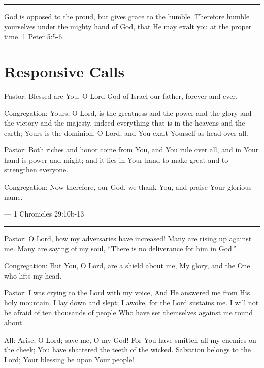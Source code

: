 \documentclass[]{book}
\begin{document}
\begin{center}\rule{0.5\linewidth}{\linethickness}\end{center}

God is opposed to the proud, but gives grace to the humble. Therefore
humble yourselves under the mighty hand of God, that He may exalt you at
the proper time. \textbar{} 1 Peter 5:5-6

\hypertarget{responsive-calls}{\section*{Responsive
Calls}\label{responsive-calls}}

Pastor: Blessed are You, O Lord God of Israel our father, forever and
ever.

Congregation: Yours, O Lord, is the greatness and the power and the
glory and the victory and the majesty, indeed everything that is in the
heavens and the earth; Yours is the dominion, O Lord, and You exalt
Yourself as head over all.

Pastor: Both riches and honor come from You, and You rule over all, and
in Your hand is power and might; and it lies in Your hand to make great
and to strengthen everyone.

Congregation: Now therefore, our God, we thank You, and praise Your
glorious name.

--- \textbar{} 1 Chronicles 29:10b-13 \textbar{}

\begin{center}\rule{0.5\linewidth}{\linethickness}\end{center}

Pastor: O Lord, how my adversaries have increased! Many are rising up
against me. Many are saying of my soul, ``There is no deliverance for
him in God.''

Congregation: But You, O Lord, are a shield about me, My glory, and the
One who lifts my head.

Pastor: I was crying to the Lord with my voice, And He answered me from
His holy mountain. I lay down and slept; I awoke, for the Lord sustains
me. I will not be afraid of ten thousands of people Who have set
themselves against me round about.

All: Arise, O Lord; save me, O my God! For You have smitten all my
enemies on the cheek; You have shattered the teeth of the wicked.
Salvation belongs to the Lord; Your blessing be upon Your people!
\end{document}
